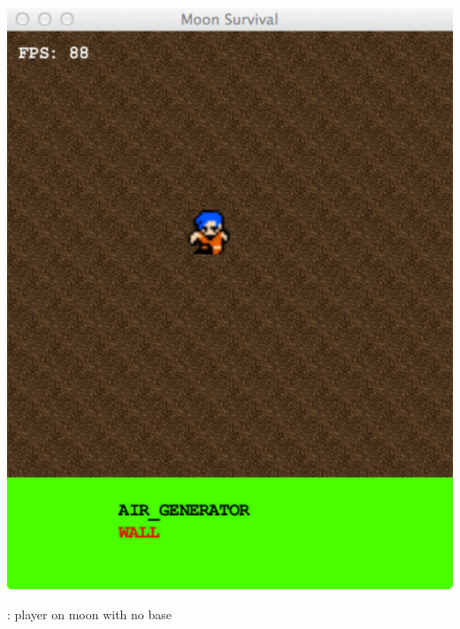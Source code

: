 \begin{marginfigure}
	\includegraphics{res/space_base_prototype/no_base.pdf}
	\caption{
	\prototypeSiddall : player on moon with no base
	}
	\label{fig:SpaceBaseNoRoom}
\end{marginfigure}

